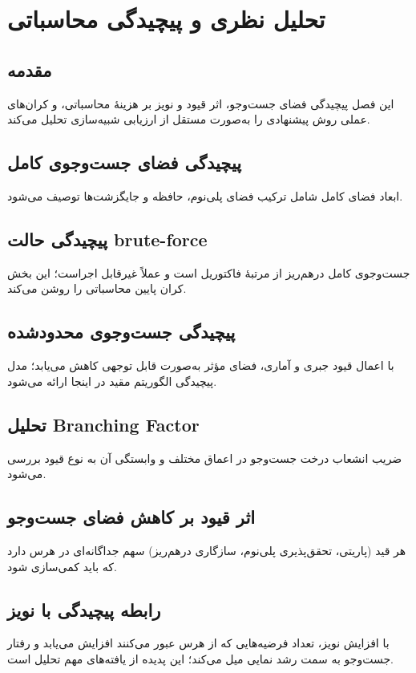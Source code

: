 \chapter{تحلیل نظری و پیچیدگی محاسباتی}
\label{chap:complexity}

\section{مقدمه}
این فصل پیچیدگی فضای جست‌وجو، اثر قیود و نویز بر هزینهٔ محاسباتی، و کران‌های عملی روش پیشنهادی را به‌صورت مستقل از ارزیابی شبیه‌سازی تحلیل می‌کند.

\section{پیچیدگی فضای جست‌وجوی کامل}
ابعاد فضای کامل شامل ترکیب فضای پلی‌نوم، حافظه و جایگزشت‌ها توصیف می‌شود.

\section{پیچیدگی حالت brute-force}
جست‌وجوی کامل درهم‌ریز از مرتبهٔ فاکتوریل است و عملاً غیرقابل اجراست؛ این بخش کران پایین محاسباتی را روشن می‌کند.

\section{پیچیدگی جست‌وجوی محدودشده}
با اعمال قیود جبری و آماری، فضای مؤثر به‌صورت قابل توجهی کاهش می‌یابد؛ مدل پیچیدگی الگوریتم مقید در اینجا ارائه می‌شود.

\section{تحلیل Branching Factor}
ضریب انشعاب درخت جست‌وجو در اعماق مختلف و وابستگی آن به نوع قیود بررسی می‌شود.

\section{اثر قیود بر کاهش فضای جست‌وجو}
هر قید (پاریتی، تحقق‌پذیری پلی‌نوم، سازگاری درهم‌ریز) سهم جداگانه‌ای در هرس دارد که باید کمی‌سازی شود.

\section{رابطه پیچیدگی با نویز}
با افزایش نویز، تعداد فرضیه‌هایی که از هرس عبور می‌کنند افزایش می‌یابد و رفتار جست‌وجو به سمت رشد نمایی میل می‌کند؛ این پدیده از یافته‌های مهم تحلیل است.

